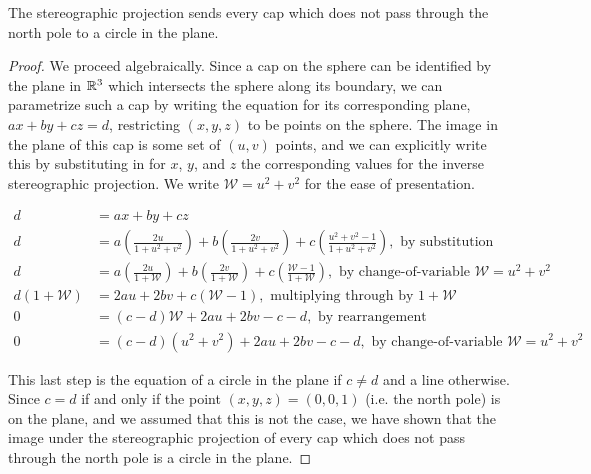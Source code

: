 \begin{lemma}
  The stereographic projection sends every cap which does not pass through the north pole to a circle in the plane.
\end{lemma}
\begin{proof}
  We proceed algebraically.  Since a cap on the sphere can be
  identified by the plane in $\mathbb{R}^3$ which intersects the sphere along
  its boundary, we can parametrize such a cap by writing the equation
  for its corresponding plane, $ax+by+cz=d$, restricting $(x,y,z)$ to
  be points on the sphere.  The image in the plane of this cap is some
  set of $(u,v)$ points, and we can explicitly write this by
  substituting in for $x$, $y$, and $z$ the corresponding values for
  the inverse stereographic projection.  We write
  $\mathcal{W}=u^2+v^2$ for the ease of presentation. 

  \begin{align*}
    d&=ax+by+cz\\
    d&=a\left(\frac{2u}{1+u^2+v^2}\right)+b\left(\frac{2v}{1+u^2+v^2}\right)+c\left(\frac{u^2+v^2-1}{1+u^2+v^2}\right),
    \text{ by substitution}\\
    d&=a\left(\frac{2u}{1+\mathcal{W}}\right)+b\left(\frac{2v}{1+\mathcal{W}}\right)+c\left(\frac{\mathcal{W}-1}{1+\mathcal{W}}\right),
    \text{ by change-of-variable }\mathcal{W}=u^2+v^2\\
    d\left(1+\mathcal{W}\right)&=2au+2bv+c\left(\mathcal{W}-1\right),
    \text{ multiplying through by }1+\mathcal{W}\\ 0 &=
    (c-d)\mathcal{W} + 2au +2bv - c - d,\text{ by rearrangement}\\
    0 &= (c-d)(u^2+v^2)+2au+2bv - c - d,\text{ by change-of-variable
    } \mathcal{W}=u^2+v^2 
  \end{align*}

  This last step is the equation of a circle in the plane if $c\neq d$
  and a line otherwise.  Since $c=d$ if and only if the point
  $(x,y,z)=(0,0,1)$ (i.e. the north pole) is on the plane, and we
  assumed that this is not the case, we have shown that the image
  under the stereographic projection of every cap which does not pass
  through the north pole is a circle in the plane.

\end{proof}

